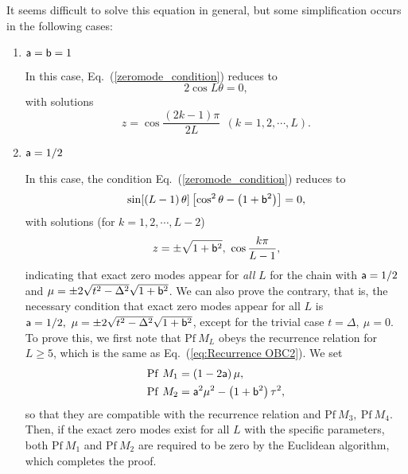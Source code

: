 \documentclass[aps, prb, showpacs, twocolumn, %
amssymb,superscriptaddress]{revtex4}
\begin{document}
It seems difficult to solve this equation in general, but some simplification occurs in the following cases: 
\begin{enumerate}
\item ${\sf a}={\sf b}=1$

In this case, Eq.~(\ref{zeromode_condition}) reduces to
\begin{equation}
2 \cos L \theta = 0,
\end{equation}
with solutions
\begin{equation}
z = \cos \frac{\left( 2k-1 \right) \pi}{2L}~~\left( k = 1,2, \cdots, L \right).
\end{equation}


\item ${\sf a} = 1/2$

In this case, the condition Eq.~(\ref{zeromode_condition}) reduces to
\begin{equation}
\sin [ \left( L - 1 \right) \theta ] \left[ \cos^{2} \theta - \left( 1 +  {\sf b}^{2} \right)  \right] = 0,
\end{equation}
with solutions (for $ k = 1,2, \cdots, L-2$)
\begin{equation}
z = \pm \sqrt{1+ {\sf b}^{2}},~\cos \frac{k \pi}{L-1},
\end{equation}
indicating that exact zero modes appear for \textit{all} $L$ for the chain with ${\sf a}=1/2$ and $\mu = \pm 2\sqrt{t^2-\Delta^2}\sqrt{1+{\sf b}^{2}}$. We can also prove the contrary, that is, the necessary condition that exact zero modes appear for all $L$ is ${\sf a}=1/2,~\mu = \pm 2\sqrt{t^2-\Delta^2}\sqrt{1+{\sf b}^{2}}$, except for the trivial case $t=\Delta,~\mu=0$. 
To prove this, we first note that $\mathrm{Pf}~M_{L}$ 
obeys the recurrence relation for $L \geq 5$, which is the same as Eq.~(\ref{eq:Recurrence OBC2}). 
We set 
\begin{align}
&\mathrm{Pf}~M_{1} = \left( 1-2{\sf a} \right) \mu,~ \nonumber \\
&\mathrm{Pf}~M_{2} = {\sf a}^{2} \mu^{2} - \left( 1+{\sf b}^{2} \right) \tau^{2},
\end{align}
so that they are compatible with the recurrence relation %
and $\mathrm{Pf}~M_{3},~\mathrm{Pf}~M_{4}$. 
Then, if the exact zero modes exist for all $L$ with the specific parameters, both  $\mathrm{Pf}~M_{1}$ and $\mathrm{Pf}~M_{2}$ are required to be zero by the Euclidean algorithm, which completes the proof.


\end{enumerate}
\end{document}
